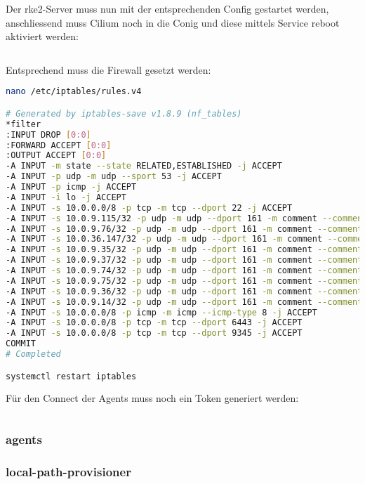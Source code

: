 Der rke2-Server muss nun mit der entsprechenden Config gestartet werden, anschliessend muss Cilium noch in die Conig und diese mittels Service reboot aktiviert werden:
\lstset{style=gra_codestyle}
\begin{lstlisting}[language=bash, caption=rke2 server starten,captionpos=b,label={lst:rke2-server-start},breaklines=true]

\end{lstlisting}

Entsprechend muss die Firewall gesetzt werden:
\lstset{style=gra_codestyle}
\begin{lstlisting}[language=bash, caption=iptables entries server,captionpos=b,label={lst:iptables-server-entries},breaklines=true]
nano /etc/iptables/rules.v4

# Generated by iptables-save v1.8.9 (nf_tables)
*filter
:INPUT DROP [0:0]
:FORWARD ACCEPT [0:0]
:OUTPUT ACCEPT [0:0]
-A INPUT -m state --state RELATED,ESTABLISHED -j ACCEPT
-A INPUT -p udp -m udp --sport 53 -j ACCEPT
-A INPUT -p icmp -j ACCEPT
-A INPUT -i lo -j ACCEPT
-A INPUT -s 10.0.0.0/8 -p tcp -m tcp --dport 22 -j ACCEPT
-A INPUT -s 10.0.9.115/32 -p udp -m udp --dport 161 -m comment --comment "Allow SNMP for probe 10.0.9.115" -j ACCEPT
-A INPUT -s 10.0.9.76/32 -p udp -m udp --dport 161 -m comment --comment "Allow SNMP for probe 10.0.9.76" -j ACCEPT
-A INPUT -s 10.0.36.147/32 -p udp -m udp --dport 161 -m comment --comment "Allow SNMP for probe 10.0.36.147" -j ACCEPT
-A INPUT -s 10.0.9.35/32 -p udp -m udp --dport 161 -m comment --comment "Allow SNMP for probe 10.0.9.35" -j ACCEPT
-A INPUT -s 10.0.9.37/32 -p udp -m udp --dport 161 -m comment --comment "Allow SNMP for probe 10.0.9.37" -j ACCEPT
-A INPUT -s 10.0.9.74/32 -p udp -m udp --dport 161 -m comment --comment "Allow SNMP for probe 10.0.9.74" -j ACCEPT
-A INPUT -s 10.0.9.75/32 -p udp -m udp --dport 161 -m comment --comment "Allow SNMP for probe 10.0.9.75" -j ACCEPT
-A INPUT -s 10.0.9.36/32 -p udp -m udp --dport 161 -m comment --comment "Allow SNMP for probe 10.0.9.36" -j ACCEPT
-A INPUT -s 10.0.9.14/32 -p udp -m udp --dport 161 -m comment --comment "Allow SNMP for probe 10.0.9.14" -j ACCEPT
-A INPUT -s 10.0.0.0/8 -p icmp -m icmp --icmp-type 8 -j ACCEPT
-A INPUT -s 10.0.0.0/8 -p tcp -m tcp --dport 6443 -j ACCEPT
-A INPUT -s 10.0.0.0/8 -p tcp -m tcp --dport 9345 -j ACCEPT
COMMIT
# Completed

systemctl restart iptables
\end{lstlisting}

Für den Connect der Agents muss noch ein Token generiert werden:
\begin{lstlisting}[language=bash, caption=rke2 server token,captionpos=b,label={lst:rke2-server-token},breaklines=true]
\end{lstlisting}

\subsubsection{agents}

\subsubsection{local-path-provisioner}

